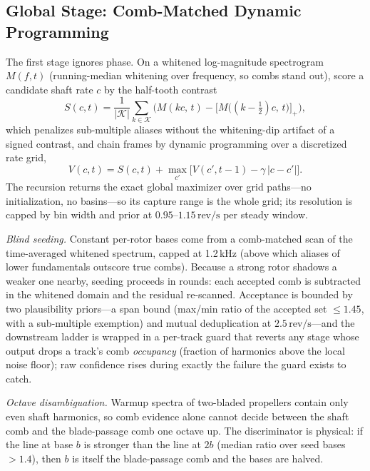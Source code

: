 \documentclass[journal]{IEEEtran}
\newcommand{\revps}{\ensuremath{\,\mathrm{rev/s}}}
\begin{document}
\subsection{Global Stage: Comb-Matched Dynamic Programming}
\label{sec:global}

The first stage ignores phase. On a whitened log-magnitude spectrogram
$M(f,t)$ (running-median whitening over frequency, so combs stand out),
score a candidate shaft rate $c$ by the half-tooth contrast
\begin{equation}
  S(c,t) = \frac{1}{|\mathcal{K}|}\sum_{k \in \mathcal{K}}
  \Big( M(kc,\, t) - \big[M\big((k{-}\tfrac12)c,\, t\big)\big]_+ \Big),
  \label{eq:combscore}
\end{equation}
which penalizes sub-multiple aliases without the whitening-dip artifact of
a signed contrast, and chain frames by dynamic programming over a
discretized rate grid,
\begin{equation}
  V(c,t) = S(c,t) + \max_{c'} \big[ V(c', t{-}1) - \gamma\, |c - c'|
  \big].
  \label{eq:viterbi}
\end{equation}
The recursion returns the exact global maximizer over grid paths---no
initialization, no basins---so its capture range is the whole grid; its
resolution is capped by bin width and prior at $0.95$--$1.15\revps$ per
steady window.

\emph{Blind seeding.} Constant per-rotor bases come from a comb-matched
scan of the time-averaged whitened spectrum, capped at 1.2\,kHz (above
which aliases of lower fundamentals outscore true combs). Because a
strong rotor shadows a weaker one nearby, seeding proceeds in rounds:
each accepted comb is subtracted in the whitened domain and the residual
re-scanned. Acceptance is bounded by two plausibility priors---a span
bound (max/min ratio of the accepted set $\le 1.45$, with a sub-multiple
exemption) and mutual deduplication at $2.5\revps$---and the downstream
ladder is wrapped in a per-track guard that reverts any stage whose
output drops a track's comb \emph{occupancy} (fraction of harmonics above
the local noise floor); raw confidence rises during exactly the failure
the guard exists to catch.

\emph{Octave disambiguation.} Warmup spectra of two-bladed propellers
contain only even shaft harmonics, so comb evidence alone cannot decide
between the shaft comb and the blade-passage comb one octave up. The
discriminator is physical: if the line at base $b$ is stronger than the
line at $2b$ (median ratio over seed bases $> 1.4$), then $b$ is itself
the blade-passage comb and the bases are halved.
\end{document}
